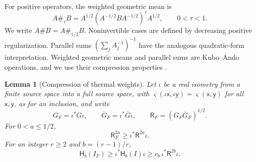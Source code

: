 \documentclass[11pt]{amsart}
\numberwithin{equation}{section}
\newtheorem{lemma}[theorem]{Lemma}
\theoremstyle{definition}
\newcommand{\Res}{\mathsf R}
\newcommand{\Therm}{\mathsf H}
\newcommand{\sx}{\mathsf x}
\newcommand{\sy}{\mathsf y}
\begin{document}
For positive operators, the weighted geometric mean is
\[
 A\#_\tau B
 =A^{1/2}(A^{-1/2}BA^{-1/2})^\tau A^{1/2},
 \qquad 0<\tau<1.
\]
We write \(A\#B=A\#_{1/2}B\). Noninvertible cases are defined by
decreasing positive regularization. Parallel sums
\((\sum_jA_j^{-1})^{-1}\) have the analogous quadratic-form
interpretation. Weighted geometric means and parallel sums are
Kubo--Ando operations, and we use their compression properties
\cite[Theorems~3.4 and~3.5]{KA80}.

\begin{lemma}[Compression of thermal weights]\label{lem:compression}
Let \(\iota\) be a real isometry from a finite source space into a
full source space, with \(\varsigma(\iota\sx,\iota\sy)=\varsigma(\sx,\sy)\) for all
\(\sx,\sy\), as for an inclusion, and write
\[
 G_F=\iota^*G\iota,\qquad
 \overline G_F=\iota^*\overline G\iota,\qquad
 \Res_F=(G_F\overline G_F)^{1/2}.
\]
For \(0<a\le1/2\),
\begin{equation}
 \Res_F^{2a}\ge\iota^*\Res^{2a}\iota.
 \label{eq:low-compression}
\end{equation}
For an integer \(r\ge2\) and \(b=(r-1)/r\),
\begin{equation}
 \Therm_b(I_F)\ge\iota^*\Therm_b(I)\iota
 \ge c_b\,\iota^*\Res^{2b}\iota.
 \label{eq:high-compression}
\end{equation}
\end{lemma}
\end{document}
